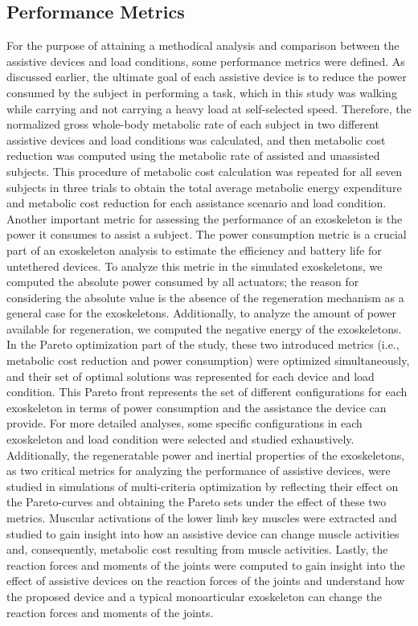 \documentclass[10pt,letterpaper]{article}
\begin{document}
\subsection*{Performance Metrics}
For the purpose of attaining a methodical analysis and comparison between the assistive devices and load conditions, some performance metrics were defined. As discussed earlier, the ultimate goal of each assistive device is to reduce the power consumed by the subject in performing a task, which in this study was walking while carrying and not carrying a heavy load at self-selected speed.
Therefore, the normalized gross whole-body metabolic rate of each subject in two different assistive devices and load conditions was calculated, and then metabolic cost reduction was computed using the metabolic rate of assisted and unassisted subjects. This procedure of metabolic cost calculation was repeated for all seven subjects in three trials to obtain the total average metabolic energy expenditure and metabolic cost reduction for each assistance scenario and load condition.\\
Another important metric for assessing the performance of an exoskeleton is the power it consumes to assist a subject. The power consumption metric is a crucial part of an exoskeleton analysis to estimate the efficiency and battery life for untethered devices. To analyze this metric in the simulated exoskeletons, we computed the absolute power consumed by all actuators; the reason for considering the absolute value is the absence of the regeneration mechanism as a general case for the exoskeletons. Additionally, to analyze the amount of power available for regeneration, we computed the negative energy of the exoskeletons.
In the Pareto optimization part of the study, these two introduced metrics (i.e., metabolic cost reduction and power consumption) were optimized simultaneously, and their set of optimal solutions was represented for each device and load condition. This Pareto front represents the set of different configurations for each exoskeleton in terms of power consumption and the assistance the device can provide. For more detailed analyses, some specific configurations in each exoskeleton and load condition were selected and studied exhaustively.\\
Additionally, the regeneratable power and inertial properties of the exoskeletons, as two critical metrics for analyzing the performance of assistive devices, were studied in simulations of multi-criteria optimization by reflecting their effect on the Pareto-curves and obtaining the Pareto sets under the effect of these two metrics.
Muscular activations of the lower limb key muscles were extracted and studied to gain insight into how an assistive device can change muscle activities and, consequently, metabolic cost resulting from muscle activities. 
Lastly, the reaction forces and moments of the joints  were computed to gain insight into the effect of assistive devices on the reaction forces of the joints and understand how the proposed device and a typical monoarticular exoskeleton can change the reaction forces and moments of the joints. 
\end{document}

